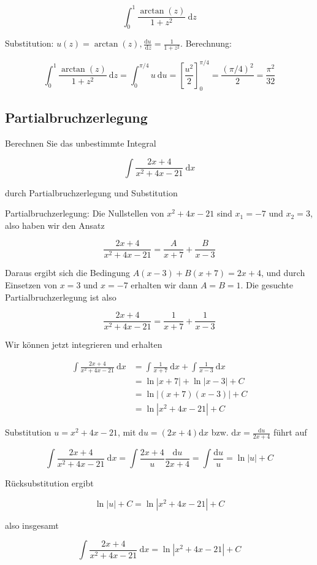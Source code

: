 \begin{example}
   
    $$\int_{0}^{1} \frac{\arctan (z)}{1+z^{2}} \mathrm{~d} z$$

Substitution: $u(z)=\arctan (z), \frac{\mathrm{d} u}{\mathrm{~d} z}=\frac{1}{1+z^{2}}$. Berechnung:

$$
\int_{0}^{1} \frac{\arctan (z)}{1+z^{2}} \mathrm{~d} z=\int_{0}^{\pi / 4} u \mathrm{~d} u=\left[\frac{u^{2}}{2}\right]_{0}^{\pi / 4}=\frac{(\pi / 4)^{2}}{2}=\frac{\pi^{2}}{32}
$$
\end{example}

\raggedcolumns

\subsection*{Partialbruchzerlegung}

\begin{example}

    Berechnen Sie das unbestimmte Integral

    $$
    \int \frac{2 x+4}{x^{2}+4 x-21} \mathrm{~d} x
    $$

    durch Partialbruchzerlegung und Substitution

    \tcblower

    Partialbruchzerlegung: Die Nullstellen von $x^{2}+4 x-21$ sind $x_{1}=-7$ und $x_{2}=3$, also haben wir den Ansatz

$$
\frac{2 x+4}{x^{2}+4 x-21}=\frac{A}{x+7}+\frac{B}{x-3}
$$

Daraus ergibt sich die Bedingung $A(x-3)+B(x+7)=2 x+4$, und durch Einsetzen von $x=3$ und $x=-7$ erhalten wir dann $A=B=1$. Die gesuchte Partialbruchzerlegung ist also

$$
\frac{2 x+4}{x^{2}+4 x-21}=\frac{1}{x+7}+\frac{1}{x-3}
$$

Wir können jetzt integrieren und erhalten

$$
\begin{aligned}
\int \frac{2 x+4}{x^{2}+4 x-21} \mathrm{~d} x & =\int \frac{1}{x+7} \mathrm{~d} x+\int \frac{1}{x-3} \mathrm{~d} x \\
& =\ln |x+7|+\ln |x-3|+C \\
& =\ln |(x+7)(x-3)|+C \\
& =\ln \left|x^{2}+4 x-21\right|+C
\end{aligned}
$$



Substitution $u=x^{2}+4 x-21$, mit $\mathrm{d} u=(2 x+4) \mathrm{d} x$ bzw. $\mathrm{d} x=\frac{\mathrm{d} u}{2 x+4}$ führt auf

$$
\int \frac{2 x+4}{x^{2}+4 x-21} \mathrm{~d} x=\int \frac{2 x+4}{u} \frac{\mathrm{d} u}{2 x+4}=\int \frac{\mathrm{d} u}{u}=\ln |u|+C
$$

Rücksubstitution ergibt

$$
\ln |u|+C=\ln \left|x^{2}+4 x-21\right|+C
$$

also insgesamt

$$
\int \frac{2 x+4}{x^{2}+4 x-21} \mathrm{~d} x=\ln \left|x^{2}+4 x-21\right|+C
$$

\end{example}

